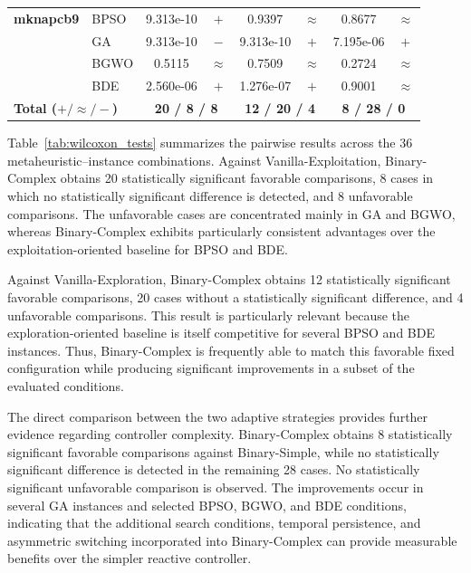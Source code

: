 \documentclass[journal,article,submit,moreauthors]{Definitions/mdpi}
\begin{document}
\begin{table}[htbp]
\begin{tabular*}{\textwidth}{@{\extracolsep{\fill}}llcccccc@{}}
    \midrule
    \textbf{mknapcb9}  & BPSO  & 9.313e-10 & $+$ & 0.9397 & $\approx$ & 0.8677 & $\approx$ \\
                       & GA    & 9.313e-10 & $-$ & 9.313e-10 & $+$ & 7.195e-06 & $+$ \\
                       & BGWO  & 0.5115 & $\approx$ & 0.7509 & $\approx$ & 0.2724 & $\approx$ \\
                       & BDE   & 2.560e-06 & $+$ & 1.276e-07 & $+$ & 0.9001 & $\approx$ \\
    \midrule
    \multicolumn{2}{l}{\textbf{Total ($+ / \approx / -$)}} & \multicolumn{2}{c}{\textbf{20 / 8 / 8}} & \multicolumn{2}{c}{\textbf{12 / 20 / 4}} & \multicolumn{2}{c}{\textbf{8 / 28 / 0}} \\
    \bottomrule
  \end{tabular*}
  \vspace{1ex}
\end{table}

Table~\ref{tab:wilcoxon_tests} summarizes the pairwise results across the
36 metaheuristic--instance combinations. Against Vanilla-Exploitation,
Binary-Complex obtains 20 statistically significant favorable comparisons,
8 cases in which no statistically significant difference is detected, and
8 unfavorable comparisons. The unfavorable cases are concentrated mainly
in GA and BGWO, whereas Binary-Complex exhibits particularly consistent
advantages over the exploitation-oriented baseline for BPSO and BDE.

Against Vanilla-Exploration, Binary-Complex obtains 12 statistically
significant favorable comparisons, 20 cases without a statistically
significant difference, and 4 unfavorable comparisons. This result is
particularly relevant because the exploration-oriented baseline is itself
competitive for several BPSO and BDE instances. Thus, Binary-Complex is
frequently able to match this favorable fixed configuration while producing
significant improvements in a subset of the evaluated conditions.

The direct comparison between the two adaptive strategies provides further
evidence regarding controller complexity. Binary-Complex obtains 8
statistically significant favorable comparisons against Binary-Simple,
while no statistically significant difference is detected in the remaining
28 cases. No statistically significant unfavorable comparison is observed.
The improvements occur in several GA instances and selected BPSO, BGWO, and
BDE conditions, indicating that the additional search conditions, temporal
persistence, and asymmetric switching incorporated into Binary-Complex can
provide measurable benefits over the simpler reactive controller.
\end{document}
